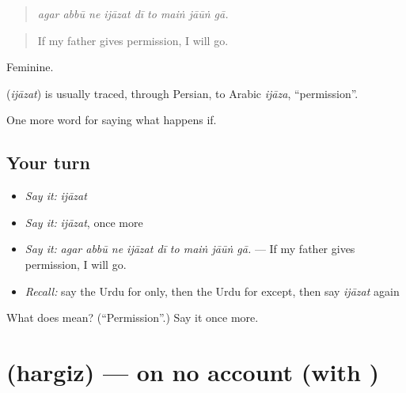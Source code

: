 \begin{quote}
        
\end{quote}

\begin{quote}
\emph{agar abbū ne ijāzat dī to maiṅ jāūṅ gā.}
\end{quote}

\begin{quote}
If my father gives permission, I will go.
\end{quote}

Feminine.

\begin{cousinweb}
\textbf{} (\emph{ijāzat}) is usually traced, through Persian, to Arabic \emph{ijāza}, \textquotedblleft{}permission\textquotedblright{}.
\end{cousinweb}

\begin{grammarlens}[title={What you've built}]
One more word for saying what happens if.
\end{grammarlens}

\subsection*{Your turn}
\begin{itemize}
\raggedright
  \item \emph{Say it:} \emph{ijāzat}
  \item \emph{Say it:} \emph{ijāzat}, once more
  \item \emph{Say it:} \emph{agar abbū ne ijāzat dī to maiṅ jāūṅ gā.} — If my father gives permission, I will go.
  \item \emph{Recall:} say the Urdu for only, then the Urdu for except, then say \emph{ijāzat} again
\end{itemize}

\begin{tcolorbox}[breakable,colback=teal!4,colframe=teal!35!black,title={Before you move on}]
What does  mean? (\textquotedblleft{}Permission\textquotedblright{}.) Say it once more.
\end{tcolorbox}
\section[\texorpdfstring{\ur{ہرگز} (hargiz)}{ہرگز (hargiz)}]{ (hargiz) — on no account (with )}

